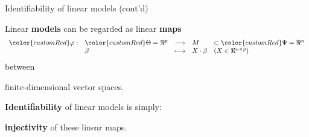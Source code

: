 \begin{frame}{\LARGE Identifiability of linear models (cont'd)}

\large
Linear \textbf{models} can be regarded as linear \textbf{maps}
\pause
{\LARGE
\begin{equation*}
\begin{array}{clcll}
{\color{customRed}\varphi} : & {\color{customRed}\Theta} = \Re^{p} & \longrightarrow & M & \subset {\color{customRed}\Psi} = \Re^{n} \\
& \beta & \longmapsto & X\cdot\beta & (X \in \Re^{n\times p})
\end{array}
\end{equation*}
}
between
\pause
\begin{center}\vskip 0.2cm{\LARGE finite-dimensional vector spaces.}\end{center}

\pause
\vskip 0.5cm
\textbf{Identifiability} of linear models is simply:
\pause
\begin{center}{\LARGE\textbf{injectivity} of these linear maps.}\end{center}

\end{frame}
\normalsize

